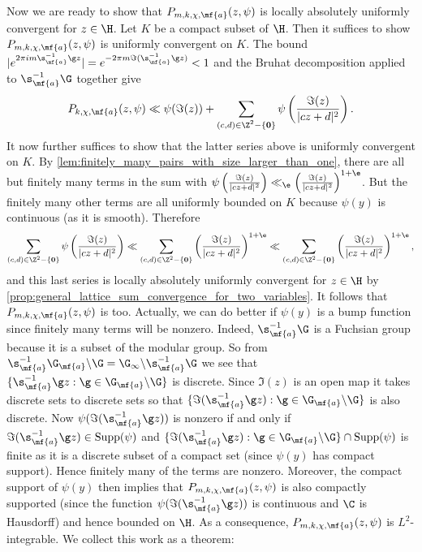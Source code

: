     Now we are ready to show that $P_{m,k,\chi,\mf{a}}(z,\psi)$ is locally absolutely uniformly convergent for $z \in \H$. Let $K$ be a compact subset of $\H$. Then it suffices to show $P_{m,k,\chi,\mf{a}}(z,\psi)$ is uniformly convergent on $K$. The bound $|e^{2\pi im\s_{\mf{a}}^{-1}\g z}| = e^{-2\pi m\Im(\s_{\mf{a}}^{-1}\g z)} < 1$ and the Bruhat decomposition applied to $\s_{\mf{a}}^{-1}\G$ together give
    \[
      P_{k,\chi,\mf{a}}(z,\psi) \ll \psi(\Im(z))+\sum_{\substack{(c,d) \in \Z^{2}-\{\mathbf{0}\}}}\psi\left(\frac{\Im(z)}{|cz+d|^{2}}\right).
    \]
    It now further suffices to show that the latter series above is uniformly convergent on $K$. By \cref{lem:finitely_many_pairs_with_size_larger_than_one}, there are all but finitely many terms in the sum with $\psi\left(\frac{\Im(z)}{|cz+d|^{2}}\right) \ll_{\e} \left(\frac{\Im(z)}{|cz+d|^{2}}\right)^{1+\e}$. But the finitely many other terms are all uniformly bounded on $K$ because $\psi(y)$ is continuous (as it is smooth). Therefore
    \[
      \sum_{(c,d) \in \Z^{2}-\{\mathbf{0}\}}\psi\left(\frac{\Im(z)}{|cz+d|^{2}}\right) \ll \sum_{(c,d) \in \Z^{2}-\{\mathbf{0}\}}\left(\frac{\Im(z)}{|cz+d|^{2}}\right)^{1+\e} \ll \sum_{(c,d) \in \Z^{2}-\{\mathbf{0}\}}\left(\frac{\Im(z)}{|cz+d|^{2}}\right)^{1+\e},
    \]
    and this last series is locally absolutely uniformly convergent for $z \in \H$ by \cref{prop:general_lattice_sum_convergence_for_two_variables}. It follows that $P_{m,k,\chi,\mf{a}}(z,\psi)$ is too. Actually, we can do better if $\psi(y)$ is a bump function since finitely many terms will be nonzero. Indeed, $\s_{\mf{a}}^{-1}\G$ is a Fuchsian group because it is a subset of the modular group. So from $\s_{\mf{a}}^{-1}\G_{\mf{a}}\backslash\G = \G_{\infty}\backslash\s_{\mf{a}}^{-1}\G$ we see that $\{\s_{\mf{a}}^{-1}\g z:\g \in \G_{\mf{a}}\backslash\G\}$ is discrete. Since $\Im(z)$ is an open map it takes discrete sets to discrete sets so that $\{\Im(\s_{\mf{a}}^{-1}\g z):\g \in \G_{\mf{a}}\backslash\G\}$ is also discrete. Now $\psi(\Im(\s_{\mf{a}}^{-1}\g z))$ is nonzero if and only if $\Im(\s_{\mf{a}}^{-1}\g z) \in \mathrm{Supp}(\psi)$ and $\{\Im(\s_{\mf{a}}^{-1}\g z):\g \in \G_{\mf{a}}\backslash\G\} \cap \mathrm{Supp}(\psi)$ is finite as it is a discrete subset of a compact set (since $\psi(y)$ has compact support). Hence finitely many of the terms are nonzero. Moreover, the compact support of $\psi(y)$ then implies that $P_{m,k,\chi,\mf{a}}(z,\psi)$ is also compactly supported (since the function $\psi(\Im(\s_{\mf{a}}^{-1}\g z))$ is continuous and $\C$ is Hausdorff) and hence bounded on $\H$. As a consequence, $P_{m,k,\chi,\mf{a}}(z,\psi)$ is $L^{2}$-integrable. We collect this work as a theorem:


